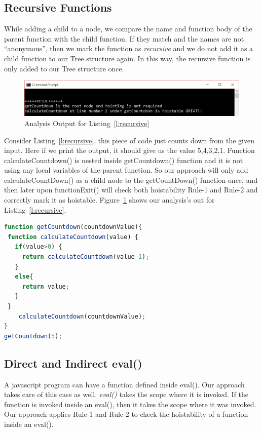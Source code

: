 \documentclass[authoryear,preprint]{sigplanconf}
\begin{document}
\subsection{Recursive Functions}
\label{subsec:recursive}
While adding a child to a node, we compare the name and function body of the parent function with the child function. If they match and the names are not \enquote{anonymous}, then we mark the function as \textit{recursive} and we do not add it as a child function to our Tree structure again. In this way, the recursive function is only added to our Tree structure once. \par

\begin{figure}[H]
  \centering
  \includegraphics[width=\linewidth]{result_recursive.png}
  \caption{Analysis Output for Listing~\ref{l:recursive}}
  \label{fig:result_recursive}
\end{figure}


Consider Listing~\ref{l:recursive}, this piece of code just counts down from the given input. Here if we print the output, it should give us the value 5,4,3,2,1. Function calculateCountdown() is nested inside getCountdown() function and it is not using any local variables of the parent function. So our approach will only add calculateCountDown() as a child node to the getCountDown() function once, and then later upon functionExit() will check both hoistability Rule-1 and Rule-2 and correctly mark it as hoistable. Figure~\ref{fig:result_recursive} shows our analysis's out for Listing~\ref{l:recursive}.

\lstset{numbers=left, numberstyle=\tiny, stepnumber=1, numbersep=5pt}
\lstset{basicstyle=\ttfamily}
\lstset{frame=tb, frame=bottomline}

\begin{lstlisting}[float,caption=Recursive Functions ,label=l:recursive,language=JavaScript]
function getCountdown(countdownValue){
 function calculateCountdown(value) {
   if(value>0) {
     return calculateCountdown(value-1);
   } 
   else{
     return value;
   }
 }
    calculateCountdown(countdownValue);
}
getCountdown(5);

\end{lstlisting} 


\subsection{Direct and Indirect eval()}
A javascript program can have a function defined inside eval(). Our approach takes care of this case as well. \textit{eval()} takes the scope where it is invoked. If the function is invoked inside an eval(), then it takes the scope where it was invoked. Our approach applies Rule-1 and Rule-2 to check the hoistability of a function inside an eval().\par
\end{document}
